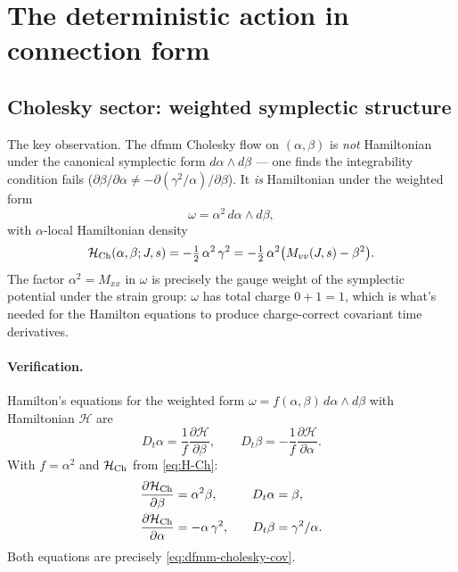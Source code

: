 \documentclass[11pt]{article}
\newcommand{\half}{\tfrac{1}{2}}
\begin{document}
\section{The deterministic action in connection form}

\subsection{Cholesky sector: weighted symplectic structure}
The key observation. The dfmm Cholesky flow on $(\alpha,\beta)$ is
\emph{not} Hamiltonian under the canonical symplectic form $d\alpha
\wedge d\beta$ --- one finds the integrability condition fails
($\partial\beta/\partial\alpha \neq -\partial(\gamma^2/\alpha)/\partial\beta$).
It \emph{is} Hamiltonian under the weighted form
\begin{equation}
  \omega = \alpha^2\,d\alpha\wedge d\beta,
  \label{eq:symp-form}
\end{equation}
with $\alpha$-local Hamiltonian density
\begin{equation}
  \mathcal{H}_{\rm Ch}(\alpha,\beta;J,s) = -\half\,\alpha^2\,\gamma^2
   = -\half\,\alpha^2\bigl(M_{vv}(J,s) - \beta^2\bigr).
   \label{eq:H-Ch}
\end{equation}
The factor $\alpha^2 = M_{xx}$ in $\omega$ is precisely the gauge weight
of the symplectic potential under the strain group: $\omega$ has
total charge $0+1=1$, which is what's needed for the Hamilton equations
to produce charge-correct covariant time derivatives.

\paragraph{Verification.} Hamilton's equations for the weighted form
$\omega = f(\alpha,\beta)\,d\alpha\wedge d\beta$ with Hamiltonian
$\mathcal{H}$ are
\begin{equation}
  D_t\alpha = \frac{1}{f}\frac{\partial\mathcal{H}}{\partial\beta},
  \qquad
  D_t\beta = -\frac{1}{f}\frac{\partial\mathcal{H}}{\partial\alpha}.
  \label{eq:Hamilton-weighted}
\end{equation}
With $f = \alpha^2$ and $\mathcal{H}_{\rm Ch}$ from \eqref{eq:H-Ch}:
\begin{align}
  \frac{\partial\mathcal{H}_{\rm Ch}}{\partial\beta} &= \alpha^2\beta,
  &\quad
  D_t\alpha &= \beta,\\
  \frac{\partial\mathcal{H}_{\rm Ch}}{\partial\alpha} &= -\alpha\,\gamma^2,
  &\quad
  D_t\beta &= \gamma^2/\alpha.
\end{align}
Both equations are precisely \eqref{eq:dfmm-cholesky-cov}. \checkmark
\end{document}
